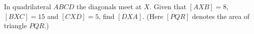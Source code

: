 In quadrilateral $ABCD$ the diagonals meet at $X$. Given that $[AXB]=8$, $[BXC]=15$ and $[CXD]=5$, find $[DXA]$. (Here $[PQR]$ denotes the area of triangle $PQR$.)
